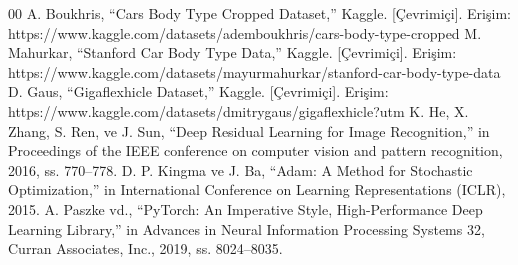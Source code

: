 \documentclass[conference]{IEEEtran}
\begin{document}
\begin{thebibliography}{00}
 A. Boukhris, ``Cars Body Type Cropped Dataset,'' Kaggle. [Çevrimiçi]. Erişim: https://www.kaggle.com/datasets/ademboukhris/cars-body-type-cropped
 M. Mahurkar, ``Stanford Car Body Type Data,'' Kaggle. [Çevrimiçi]. Erişim: https://www.kaggle.com/datasets/mayurmahurkar/stanford-car-body-type-data
 D. Gaus, ``Gigaflexhicle Dataset,'' Kaggle. [Çevrimiçi]. Erişim: https://www.kaggle.com/datasets/dmitrygaus/gigaflexhicle?utm
 K. He, X. Zhang, S. Ren, ve J. Sun, ``Deep Residual Learning for Image Recognition,'' in Proceedings of the IEEE conference on computer vision and pattern recognition, 2016, ss. 770--778.
 D. P. Kingma ve J. Ba, ``Adam: A Method for Stochastic Optimization,'' in International Conference on Learning Representations (ICLR), 2015.
 A. Paszke vd., ``PyTorch: An Imperative Style, High-Performance Deep Learning Library,'' in Advances in Neural Information Processing Systems 32, Curran Associates, Inc., 2019, ss. 8024--8035.
\end{thebibliography}
\end{document}
